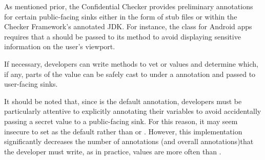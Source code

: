 
As mentioned prior, the Confidential Checker provides preliminary annotations
for certain public-facing sinks either in the form of stub files or within the
Checker Framework's annotated JDK. For instance, the  class for Android
apps requires that a  should be passed to
its  method to avoid displaying sensitive information on the user's
viewport.

If necessary, developers can write methods to vet  or
 values and determine which, if any, parts of the
value can be safely cast to  under a 
annotation and passed to user-facing sinks.

It should be noted that, since  is the default annotation,
developers must be particularly attentive to explicitly annotating their variables
to avoid accidentally passing a secret value to a public-facing sink. For this reason,
it may seem insecure to set  as the default rather than
 or . However, this implementation
significantly decreases the number of  annotations (and
overall annotations)that the developer must write, as in practice, values are more
often  than .
